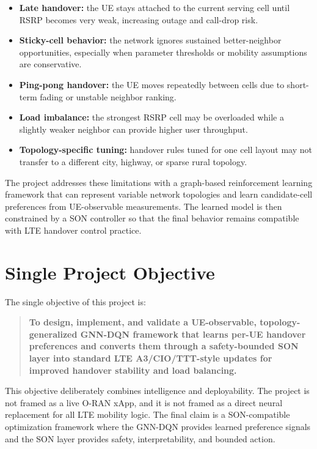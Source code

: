 \documentclass[12pt,a4paper]{report}
\begin{document}
\begin{itemize}
    \item \textbf{Late handover:} the UE stays attached to the current serving cell until RSRP becomes very weak, increasing outage and call-drop risk.
    \item \textbf{Sticky-cell behavior:} the network ignores sustained better-neighbor opportunities, especially when parameter thresholds or mobility assumptions are conservative.
    \item \textbf{Ping-pong handover:} the UE moves repeatedly between cells due to short-term fading or unstable neighbor ranking.
    \item \textbf{Load imbalance:} the strongest RSRP cell may be overloaded while a slightly weaker neighbor can provide higher user throughput.
    \item \textbf{Topology-specific tuning:} handover rules tuned for one cell layout may not transfer to a different city, highway, or sparse rural topology.
\end{itemize}

The project addresses these limitations with a graph-based reinforcement learning framework that can represent variable network topologies and learn candidate-cell preferences from UE-observable measurements. The learned model is then constrained by a SON controller so that the final behavior remains compatible with LTE handover control practice.

\section{Single Project Objective}
The single objective of this project is:

\begin{quote}
\textbf{To design, implement, and validate a UE-observable, topology-generalized GNN-DQN framework that learns per-UE handover preferences and converts them through a safety-bounded SON layer into standard LTE A3/CIO/TTT-style updates for improved handover stability and load balancing.}
\end{quote}

This objective deliberately combines intelligence and deployability. The project is not framed as a live O-RAN xApp, and it is not framed as a direct neural replacement for all LTE mobility logic. The final claim is a SON-compatible optimization framework where the GNN-DQN provides learned preference signals and the SON layer provides safety, interpretability, and bounded action.
\end{document}
